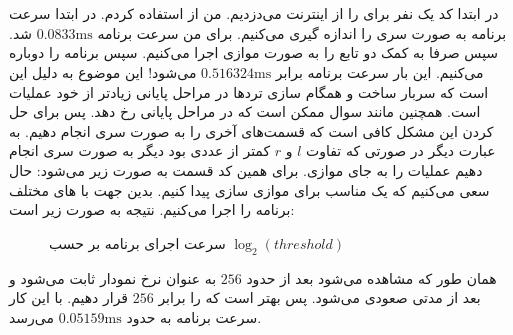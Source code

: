 \section{}
در ابتدا کد یک نفر برای
را از اینترنت می‌دزدیم. من از
استفاده کردم. در ابتدا سرعت برنامه به صورت سری را اندازه گیری می‌کنیم. برای من سرعت برنامه
$0.0833 \text{ms}$
شد. سپس صرفا به کمک
دو تابع
را به صورت موازی اجرا می‌کنیم. سپس برنامه را دوباره
می‌کنیم. این بار سرعت برنامه برابر
$0.516324 \text{ms}$
می‌شود! این موضوع به دلیل این است که سربار ساخت و همگام سازی ترد‌ها در مراحل پایانی
زیادتر از خود عملیات
است. همچنین مانند سوال ممکن است که در مراحل پایانی
رخ دهد. پس برای حل کردن این مشکل کافی است که قسمت‌های آخری
را به صورت سری انجام دهیم. به عبارت دیگر در صورتی که تفاوت
$l$ و $r$
کمتر از عددی بود دیگر به صورت سری انجام دهیم عملیات را به جای موازی.
برای همین کد قسمت
به صورت زیر می‌شود:
حال سعی می‌کنیم که یک
مناسب برای موازی سازی پیدا کنیم. بدین جهت با
های
مختلف برنامه را اجرا می‌کنیم. نتیجه به صورت زیر است:
\begin{figure}[H]
    \centering
    \caption{سرعت اجرای برنامه بر حسب $\log_2 (threshold)$}
\end{figure}
همان طور که مشاهده می‌شود بعد از حدود
$256$
به عنوان
نرخ نمودار ثابت می‌شود و بعد از مدتی صعودی می‌شود. پس بهتر است که
را برابر
$256$
قرار دهیم. با این کار سرعت برنامه به حدود
$0.05159 \text{ms}$
می‌رسد.